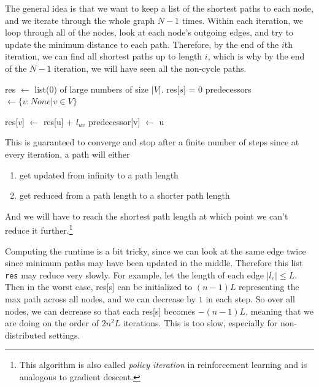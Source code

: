   \begin{algo}
    The general idea is that we want to keep a list of the shortest paths to each node, and we iterate through the whole graph $N-1$ times. Within each iteration, we loop through all of the nodes, look at each node's outgoing edges, and try to update the minimum distance to each path. Therefore, by the end of the $i$th iteration, we can find all shortest paths up to length $i$, which is why by the end of the $N-1$ iteration, we will have seen all the non-cycle paths.    
    \begin{algorithm}[H]
      \label{alg:neg_weighted_short_path}
      \begin{algorithmic}[1]
          \State res $\gets$ list(0) of large numbers of size $|V|$. 
          \State res[$s$] = 0
          \State predecessors $\gets \{v : None | v \in V\}$

            \State res[$v$] $\gets$ res[u] + $l_{uv}$
            \State predecessor[v] $\gets$ u
          \EndWhile

        \EndFunction
      \end{algorithmic}
    \end{algorithm}
    This is guaranteed to converge and stop after a finite number of steps since at every iteration, a path will either 
    \begin{enumerate}
      \item get updated from infinity to a path length 
      \item get reduced from a path length to a shorter path length
    \end{enumerate} 
    And we will have to reach the shortest path length at which point we can't reduce it further.\footnote{This algorithm is also called \textit{policy iteration} in reinforcement learning and is analogous to gradient descent.} 

    Computing the runtime is a bit tricky, since we can look at the same edge twice since minimum paths may have been updated in the middle. Therefore this list \texttt{res} may reduce very slowly. For example, let the length of each edge $|l_e| \leq L$. Then in the worst case, res[s] can be initialized to $(n-1) L$ representing the max path across all nodes, and we can decrease by $1$ in each step. So over all nodes, we can decrease so that each res[s] becomes $-(n-1)L$, meaning that we are doing on the order of $2 n^2 L$ iterations. This is too slow, especially for non-distributed settings. 
  \end{algo}

